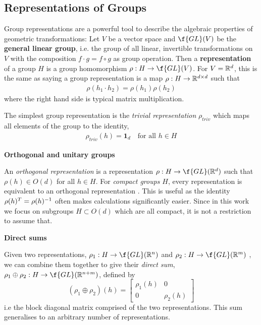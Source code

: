 \subsection{Representations of Groups}
Group representations are a powerful tool to describe the algebraic properties of geometric transformations: \hypertarget{def:representation}{} Let $V$ be a vector space and $\f{GL}(V)$ be the \textbf{general linear group}, i.e. the group of all linear, invertible transformations on $V$ with the composition $f\cdot g=f\circ g$ as group operation.
Then a \textbf{representation} of a group $H$ is a group homomorphism $\rho:\hrp\to \f{GL}(V)$.
For $V=\mathbb{R}^d$, this is the same as saying a group representation is a map $\rho: H \to \mathbb{R}^{d\times d}$ such that \begin{align*} \rho(h_1\cdot h_2)=\rho(h_1) \rho(h_2) \end{align*} where the right hand side is typical matrix multiplication.

The simplest group representation is the \hypertarget{trivialrep}{\textit{trivial representation}} $\rho_{triv}$ which maps all elements of the group to the identity, \begin{align} \rho_{triv}(h) =\mathbf{1}_{d} \quad\text{for all }h\in H \end{align} 

\textbf{Orthogonal and unitary groups} 

An \hypertarget{def:orthogonal_representation}{\textit{orthogonal representation}} is a representation $\rho:H\to\f{GL}(\R^d)$ such that $\rho(h)\in O(d)$ for all $h\in H$.
For \textit{compact groups} $H$, every representation is equivalent to an orthogonal representation \parencite[Theorem II.1.7]{GroupRepRef}.
This is useful as the identity $\rho(h)^T = \rho(h)^{-1}$ often makes calculations significantly easier.
Since in this work we focus on subgroups $H\subset O(d)$ which are all compact, it is not a restriction to assume that.

\textbf{Direct sums}

Given two representations, $\rho_1: \hrp \to \f{GL}(\R^n)$ and $\rho_2: \hrp \to \f{GL}(\R^m)$ , we can combine them together to give their \textit{direct sum}, $\rho_1 \oplus \rho_2: H\to \f{GL}(\R^{n+m})$, defined by \begin{equation} (\rho_1 \oplus \rho_2)(h) = \begin{bmatrix} \rho_1(h) & 0 \\ 0 & \rho_2(h) \end{bmatrix} \end{equation} i.e the block diagonal matrix comprised of the two representations.
This sum generalises to an arbitrary number of representations.

